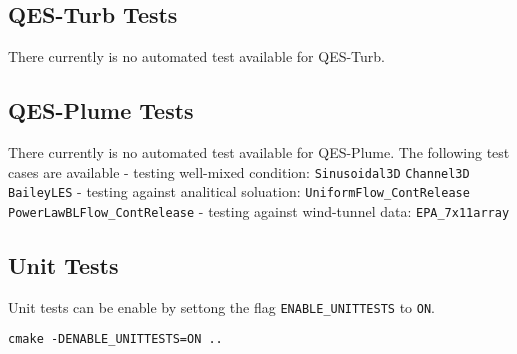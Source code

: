 \subsection{QES-Turb Tests}

There currently is no automated test available for QES-Turb.

\subsection{QES-Plume Tests}

There currently is no automated test available for QES-Plume. The following test cases are available
- testing well-mixed condition: \verb|Sinusoidal3D| \verb|Channel3D| \verb|BaileyLES|
- testing against analitical soluation: \verb|UniformFlow_ContRelease| \verb|PowerLawBLFlow_ContRelease|
- testing against wind-tunnel data: \verb|EPA_7x11array|

\subsection{Unit Tests}
Unit tests can be enable by settong the flag \verb|ENABLE_UNITTESTS| to \verb|ON|.
\begin{verbatim}
cmake -DENABLE_UNITTESTS=ON ..
\end{verbatim}
